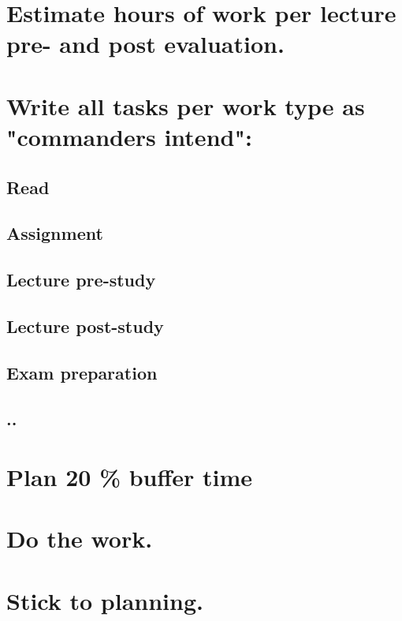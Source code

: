 \section{Estimate hours of work per lecture pre- and post evaluation.}
\section{Write all tasks per work type as "commanders intend"\cite{made_to_stick}:}
    
        \subsection{Read}
        \subsection{Assignment}
        \subsection{Lecture pre-study}
        \subsection{Lecture post-study}
        \subsection{Exam preparation}
        \subsection{..}
    
\section{Plan 20 \% buffer time}
\section{Do the work.}
\section{Stick to planning.}